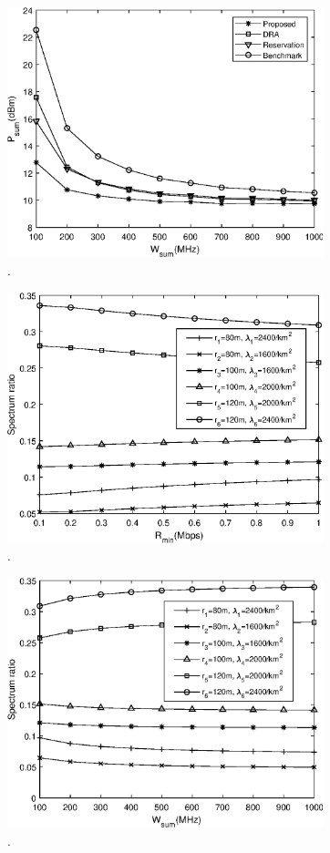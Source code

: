 \documentclass[journal]{IEEEtran}
\begin{document}
\begin{figure}
	\centering
	\includegraphics[width=3.6in]{P_wsum.eps}
	\caption{.}
\end{figure}


\begin{figure}
	\centering
	\includegraphics[width=3.6in]{SR_rmin.eps}
	\caption{.}
\end{figure}


\begin{figure}
	\centering
	\includegraphics[width=3.6in]{SR_wsum.eps}
	\caption{.}
\end{figure}
\end{document}
